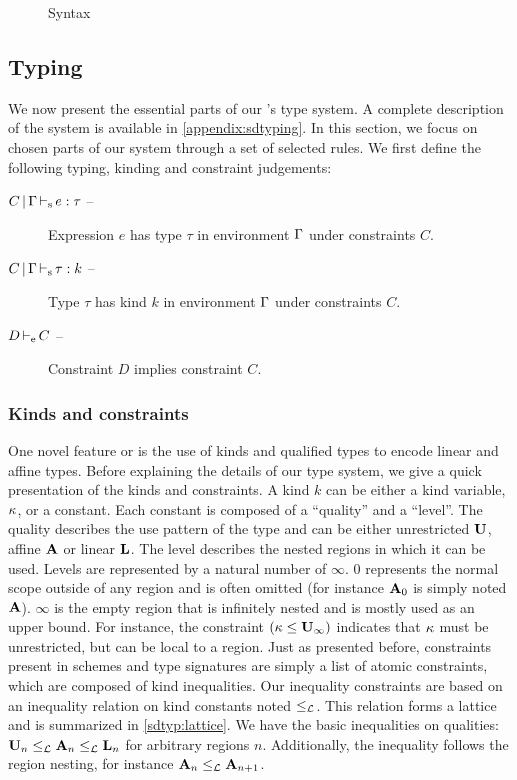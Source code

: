
\begin{figure*}[t]
  \centering
  
  \caption{Syntax}
  \label{grammar}
\end{figure*}

\subsection{Typing}
\label{sdtyping}

We now present the essential parts of our \lang's type system. A complete
description of the system is available in \cref{appendix:sdtyping}.
In this section, we focus on chosen parts of our system
through a set of selected rules.
%
We first define the following typing, kinding and constraint judgements:
\begin{description}
\item[$C \operatorname{|} \Gamma \operatorname{\vdash_s} e : \tau$ --]
  Expression $e$ has type $\tau$ in environment $\Gamma$ under constraints $C$.
\item[$C \operatorname{|} \Gamma \operatorname{\vdash_s} \tau : k$ --]
  Type $\tau$ has kind $k$ in environment $\Gamma$ under constraints $C$.
\item[$D \operatorname{\vdash_e} C$ --] Constraint $D$ implies constraint $C$.
\end{description}

\subsubsection{Kinds and constraints}

One novel feature or \affe is the use of kinds and qualified types to encode
linear and affine types. Before explaining the details of our type system, we
give a quick presentation of the kinds and constraints.
A kind $k$ can be either a kind variable, $\kappa$, or a constant.
Each constant is composed of a ``quality'' and a ``level''.
The quality describes the use pattern of the type and can be
either unrestricted $\mathbf{U}$, affine $\mathbf{A}$ or linear $\mathbf{L}$. The level
describes the nested regions in which it can be used. Levels are represented
by a natural number of $\infty$.
$0$ represents the normal scope outside of any region and is often omitted
(for instance $\mathbf{A}_0$ is simply noted $\mathbf{A}$).
$\infty$ is the empty region that is infinitely nested and is mostly used
as an upper bound.
For instance, the constraint $(\kappa \leq \mathbf{U}_\infty)$ indicates that
$\kappa$ must be unrestricted, but can be local to a region.
%
Just as presented before, constraints present in schemes and type signatures
are simply a list of atomic constraints, which are composed
of kind inequalities.
%
Our inequality constraints are based on an inequality relation on
kind constants noted $\leq_\mathcal L$. This relation forms a lattice
and  is summarized in
\cref{sdtyp:lattice}. We have the basic inequalities on qualities:
$\mathbf{U}_n \leq_\mathcal L \mathbf{A}_n \leq_\mathcal L \mathbf{L}_n$ for arbitrary regions $n$.
Additionally, the inequality follows the region nesting, for
instance $\mathbf{A}_n \leq_\mathcal L \mathbf{A}_{n+1}$.

